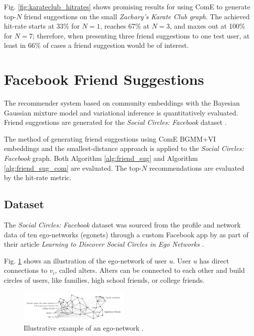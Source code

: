 \documentclass[conference]{IEEEtran}
\begin{document}
Fig. \ref{fig:karateclub_hitrates} shows promising results for using ComE to generate top-$N$ friend suggestions on the small \textit{Zachary’s Karate Club graph}. The achieved hit-rate starts at 33\% for $N=1$, reaches 67\% at $N=3$, and maxes out at 100\% for $N=7$; therefore, when presenting three friend suggestions to one test user, at least in $66\%$ of cases a friend suggestion would be of interest.


\section{Facebook Friend Suggestions}

The recommender system based on community embeddings with the Bayesian Gaussian mixture model and variational inference is quantitatively evaluated. Friend suggestions are generated for the \textit{Social Circles: Facebook} dataset \cite{social_circles_fb, social_circles_in_ego_networks}.

The method of generating friend suggestions using ComE BGMM+VI embeddings and the smallest-distance approach is applied to the \textit{Social Circles: Facebook} graph. Both Algorithm \ref{alg:friend_sug} and Algorithm \ref{alg:friend_sug_com} are evaluated. The top-$N$ recommendations are evaluated by the hit-rate metric.

\subsection{Dataset}

The \textit{Social Circles: Facebook} dataset was sourced from the profile and network data of ten ego-networks (egonets) through a custom Facebook app by \citeauthor{social_circles_in_ego_networks} as part of their \citeyear{social_circles_in_ego_networks} article \textit{Learning to Discover Social Circles in Ego Networks} \cite{social_circles_in_ego_networks}.

Fig. \ref{fig:egonet} shows an illustration of the ego-network of user $u$. User $u$ has direct connections to $v_i$, called alters. Alters can be connected to each other and build circles of users, like families, high school friends, or college friends.

\begin{figure}[htbp]
    \centering
    \includegraphics[width=0.48\textwidth]{images/fb/egonet.png}
    \caption{Illustrative example of an ego-network \cite{social_circles_in_ego_networks}.}
    \label{fig:egonet}
\end{figure}
\end{document}
